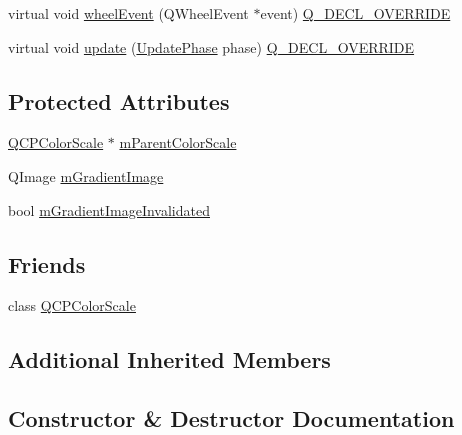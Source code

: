 \begin{DoxyCompactItemize}
\item 
virtual void \mbox{\hyperlink{class_q_c_p_color_scale_axis_rect_private_a93eeaa0c127d6d6fe8171b2455080262}{wheel\+Event}} (Q\+Wheel\+Event $\ast$event) \mbox{\hyperlink{qcustomplot_8h_a42cc5eaeb25b85f8b52d2a4b94c56f55}{Q\+\_\+\+D\+E\+C\+L\+\_\+\+O\+V\+E\+R\+R\+I\+DE}}
\item 
virtual void \mbox{\hyperlink{class_q_c_p_color_scale_axis_rect_private_add049d464b9ef2ccdc638adc4ccb4aca}{update}} (\mbox{\hyperlink{class_q_c_p_layout_element_a0d83360e05735735aaf6d7983c56374d}{Update\+Phase}} phase) \mbox{\hyperlink{qcustomplot_8h_a42cc5eaeb25b85f8b52d2a4b94c56f55}{Q\+\_\+\+D\+E\+C\+L\+\_\+\+O\+V\+E\+R\+R\+I\+DE}}
\end{DoxyCompactItemize}
\subsection*{Protected Attributes}
\begin{DoxyCompactItemize}
\item 
\mbox{\hyperlink{class_q_c_p_color_scale}{Q\+C\+P\+Color\+Scale}} $\ast$ \mbox{\hyperlink{class_q_c_p_color_scale_axis_rect_private_a311c73f51a4cb0b556388197833cf099}{m\+Parent\+Color\+Scale}}
\item 
Q\+Image \mbox{\hyperlink{class_q_c_p_color_scale_axis_rect_private_ad4f7c8ee1c6012d9950870811773119c}{m\+Gradient\+Image}}
\item 
bool \mbox{\hyperlink{class_q_c_p_color_scale_axis_rect_private_a2c0b15b071e1f93006b48b5be022a631}{m\+Gradient\+Image\+Invalidated}}
\end{DoxyCompactItemize}
\subsection*{Friends}
\begin{DoxyCompactItemize}
\item 
class \mbox{\hyperlink{class_q_c_p_color_scale_axis_rect_private_a60f6031408a325ebd1bbbad1ccf9b897}{Q\+C\+P\+Color\+Scale}}
\end{DoxyCompactItemize}
\subsection*{Additional Inherited Members}


\subsection{Constructor \& Destructor Documentation}
\mbox{\label{class_q_c_p_color_scale_axis_rect_private_ad3b242f75dd2b33581364a4e668a80db}} 
